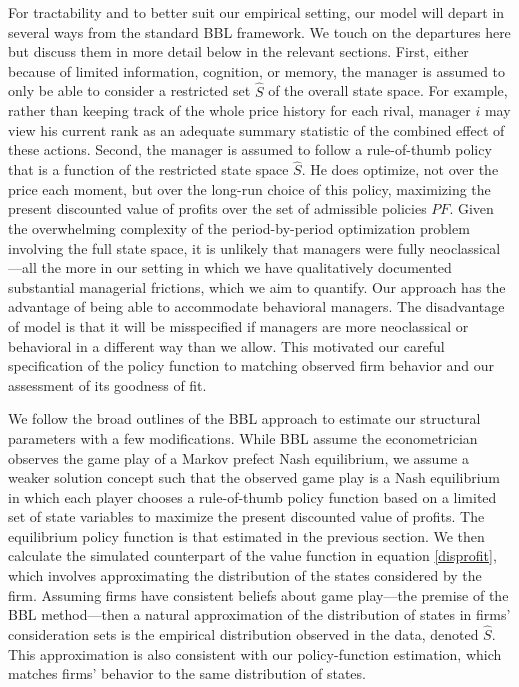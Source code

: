 \documentclass[11pt]{article}
\begin{document}
\begin{spacing}{1.3}
For tractability and to better suit our empirical setting, our model
will depart in several ways from the standard BBL framework. We touch
on the departures here but discuss them in more detail below in the
relevant sections. First, either because of limited information,
cognition, or memory, the manager is assumed to only be able to
consider a restricted set $\hat{S}$ of the overall state space. For
example, rather than keeping track of the whole price history for each
rival, manager $i$ may view his current rank as an adequate summary
statistic of the combined effect of these actions. Second, the manager
is assumed to follow a rule-of-thumb policy that is a function of the
restricted state space $\hat{S}$. He does optimize, not over the price
each moment, but over the long-run choice of this policy, maximizing
the present discounted value of profits over the set of admissible
policies $PF$. Given the overwhelming complexity of the
period-by-period optimization problem involving the full state space,
it is unlikely that managers were fully neoclassical---all the more in
our setting in which we have qualitatively documented substantial
managerial frictions, which we aim to quantify. Our approach has the
advantage of being able to accommodate behavioral managers. The
disadvantage of model is that it will be misspecified if managers are
more neoclassical or behavioral in a different way than we allow. This
motivated our careful specification of the policy function to matching
observed firm behavior and our assessment of its goodness of fit.

We follow the broad outlines of the BBL approach to estimate our
structural parameters with a few modifications.  While BBL assume the
econometrician observes the game play of a Markov prefect Nash
equilibrium, we assume a weaker solution concept such that the
observed game play is a Nash equilibrium in which each player chooses
a rule-of-thumb policy function based on a limited set of state
variables to maximize the present discounted value of profits. The
equilibrium policy function is that estimated in the previous section.
We then calculate the simulated counterpart of the value function in
equation \eqref{disprofit}, which involves approximating the
distribution of the states considered by the firm. Assuming firms have
consistent beliefs about game play---the premise of the BBL
method---then a natural approximation of the distribution of states in
firms' consideration sets is the empirical distribution observed in
the data, denoted $\hat{S}$. This approximation is also consistent
with our policy-function estimation, which matches firms' behavior to
the same distribution of states.


\end{spacing}
\end{document}
